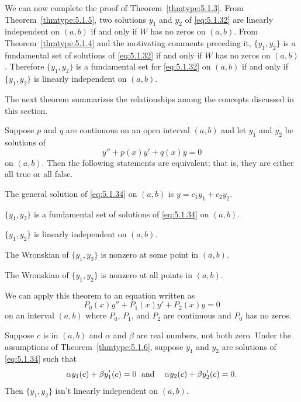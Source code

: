We can now complete the proof of Theorem~\ref{thmtype:5.1.3}. From Theorem~\ref{thmtype:5.1.5}, two
solutions $y_{1}$ and $y_{2}$ of \eqref{eq:5.1.32} are linearly independent on $(a,b)$ if and only
if $W$ has no zeros on $(a,b)$. From Theorem~\ref{thmtype:5.1.4} and the motivating comments
preceding it, $\{y_{1},y_{2}\}$ is a fundamental set of solutions of \eqref{eq:5.1.32} if and only
if $W$ has no zeros on $(a,b)$. Therefore $\{y_{1},y_{2}\}$ is a fundamental set for
\eqref{eq:5.1.32} on $(a,b)$ if and only if $\{y_{1},y_{2}\}$ is linearly independent on $(a,b)$.
\bbox

The next theorem summarizes the relationships among the concepts discussed in this section.

\begin{theorem}
  \color{blue}
  \label{thmtype:5.1.6} Suppose $p$ and $q$ are continuous on an open interval $(a,b)$ and let
  $y_{1}$ and $y_{2}$ be solutions of
  \begin{equation}
    \label{eq:5.1.34}y''+p(x)y'+q(x)y=0
  \end{equation}
  on $(a,b)$. Then the following statements are equivalent; that is, they are either all true or all
  false.
  \begin{alist}
    \item %
    The general solution of \eqref{eq:5.1.34} on $(a,b)$ is $y=c_{1}y_{1}+c_{2}y_{2}$.

    \item %
    $\{y_{1},y_{2}\}$ is a fundamental set of solutions of \eqref{eq:5.1.34} on $(a,b)$.

    \item %
    $\{y_{1},y_{2}\}$ is linearly independent on $(a,b)$.

    \item %
    The Wronskian of $\{y_{1},y_{2}\}$ is nonzero at some point in $(a,b)$.

    \item %
    The Wronskian of $\{y_{1},y_{2}\}$ is nonzero at all points in $(a,b)$.
  \end{alist}
\end{theorem}

We can apply this theorem to an equation written as
\[
  P_{0}(x)y''+P_{1}(x)y'+P_{2}(x)y=0
\]
on an interval $(a,b)$ where $P_{0}$, $P_{1}$, and $P_{2}$ are continuous and $P_{0}$ has no zeros.

\begin{theorem}
  \color{blue}
  \label{thmtype:5.1.7} Suppose $c$ is in $(a,b)$ and $\alpha$ and $\beta$ are real numbers, not
  both zero. Under the assumptions of Theorem~\ref{thmtype:5.1.6}, suppose $y_{1}$ and $y_{2}$ are
  solutions of \eqref{eq:5.1.34} such that
  \begin{equation}
    \label{eq:5.1.35}\alpha y_{1}(c)+\beta y_{1}'(c)=0\text{\; and\; \; }\alpha y_{2}(c)+\beta y_{2}'(c)=0.
  \end{equation}
  Then $\{y_{1},y_{2}\}$ isn't linearly independent on $(a,b)$.
\end{theorem}


